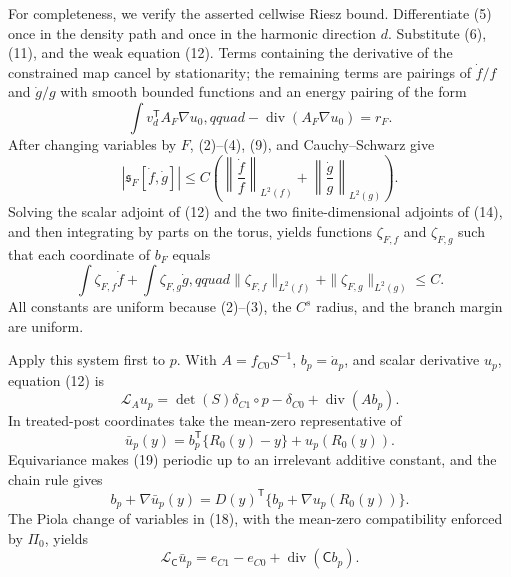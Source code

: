 For completeness, we verify the asserted cellwise Riesz bound.  Differentiate (5) once in the density path and once in the harmonic direction \(d\).  Substitute (6), (11), and the weak equation (12).  Terms containing the derivative of the constrained map cancel by stationarity; the remaining terms are pairings of \(\dot f/f\) and \(\dot g/g\) with smooth bounded functions and an energy pairing of the form
\[
 \int v_d^{\mathsf T}A_F\nabla u_0,qquad
 -\operatorname{div}(A_F\nabla u_0)=r_F.                               \tag{15}
\]
After changing variables by \(F\), (2)--(4), (9), and Cauchy--Schwarz give
\[
 |\mathfrak s_F[\dot f,\dot g]|
 \leq C\left(
 \left\|\frac{\dot f}{f}\right\|_{L^2(f)}+
 \left\|\frac{\dot g}{g}\right\|_{L^2(g)}\right).                  \tag{16}
\]
Solving the scalar adjoint of (12) and the two finite-dimensional adjoints of (14), and then integrating by parts on the torus, yields functions \(\zeta_{F,f}\) and \(\zeta_{F,g}\) such that each coordinate of \(b_F\) equals
\[
 \int\zeta_{F,f}\dot f+\int\zeta_{F,g}\dot g,qquad
 \|\zeta_{F,f}\|_{L^2(f)}+\|\zeta_{F,g}\|_{L^2(g)}\leq C.          \tag{17}
\]
All constants are uniform because (2)--(3), the \(C^s\) radius, and the branch margin are uniform.

Apply this system first to \(p\).  With \(A=f_{C0}S^{-1}\), \(b_p=\dot a_p\), and scalar derivative \(u_p\), equation (12) is
\[
 \mathcal L_Au_p=\det(S)\delta_{C1}\circ p-\delta_{C0}
                 +\operatorname{div}(Ab_p).                            \tag{18}
\]
In treated-post coordinates take the mean-zero representative of
\[
 \bar u_p(y)=b_p^{\mathsf T}\{R_0(y)-y\}+u_p(R_0(y)).                  \tag{19}
\]
Equivariance makes (19) periodic up to an irrelevant additive constant, and the chain rule gives
\[
 b_p+\nabla\bar u_p(y)
 =D(y)^{\mathsf T}\{b_p+\nabla u_p(R_0(y))\}.                          \tag{20}
\]
The Piola change of variables in (18), with the mean-zero compatibility enforced by \(\Pi_0\), yields
\[
 \mathcal L_{\mathsf C}\bar u_p
 =e_{C1}-e_{C0}+\operatorname{div}(\mathsf Cb_p).                       \tag{21}
\]

